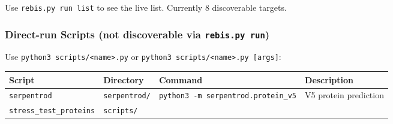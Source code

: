 Use \texttt{rebis.py\ run\ list} to see the live list. Currently 8
discoverable targets.

\hypertarget{direct-run-scripts-not-discoverable-via-rebis.py-run}{%
\subsubsection{\texorpdfstring{Direct-run Scripts (not discoverable via
\texttt{rebis.py\ run})}{Direct-run Scripts (not discoverable via rebis.py run)}}\label{direct-run-scripts-not-discoverable-via-rebis.py-run}}

Use \texttt{python3\ scripts/\textless{}name\textgreater{}.py} or
\texttt{python3\ scripts/\textless{}name\textgreater{}.py\ {[}args{]}}:

\begin{longtable}[]{@{}llll@{}}
\toprule
\begin{minipage}[b]{0.17\columnwidth}\raggedright
Script\strut
\end{minipage} & \begin{minipage}[b]{0.24\columnwidth}\raggedright
Directory\strut
\end{minipage} & \begin{minipage}[b]{0.19\columnwidth}\raggedright
Command\strut
\end{minipage} & \begin{minipage}[b]{0.28\columnwidth}\raggedright
Description\strut
\end{minipage}\tabularnewline
\midrule
\endhead
\begin{minipage}[t]{0.17\columnwidth}\raggedright
\texttt{serpentrod}\strut
\end{minipage} & \begin{minipage}[t]{0.24\columnwidth}\raggedright
\texttt{serpentrod/}\strut
\end{minipage} & \begin{minipage}[t]{0.19\columnwidth}\raggedright
\texttt{python3\ -m\ serpentrod.protein\_v5}\strut
\end{minipage} & \begin{minipage}[t]{0.28\columnwidth}\raggedright
V5 protein prediction\strut
\end{minipage}\tabularnewline
\begin{minipage}[t]{0.17\columnwidth}\raggedright
\texttt{stress\_test\_proteins}\strut
\end{minipage} & \begin{minipage}[t]{0.24\columnwidth}\raggedright
\texttt{scripts/}\strut
\end{minipage} & \begin{minipage}[t]{0.19\columnwidth}\raggedright

\end{minipage}
\end{longtable}

